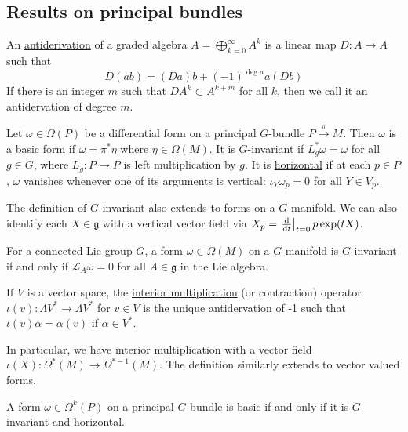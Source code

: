 \subsection{Results on principal bundles}
\begin{defn} %
	An \underline{antiderivation} of a graded algebra $A=\bigoplus_{k=0}^\infty
	A^k$ is a linear map $D : A\to A$ such that 
	 \[
	D(ab) = (Da)b + (-1)^{\deg a} a(Db)
	\] 
	If there is an integer $m$ such that  $D A^k \subset A^{k+m}$ for all $k$,
	then we call it an antidervation of degree  $m$.
\end{defn}
\begin{defn} 
	Let  $\omega\in \Omega(P)$ be a differential form on a principal $G$-bundle
	$P\xrightarrow{\pi} M$. 
	Then $\omega$ is a \underline{basic form} if  $\omega = \pi^*\eta$
	where  $\eta\in\Omega(M)$. 
	It is \underline{$G$-invariant} if $L^*_g \omega =\omega$ for all  $g\in G$,
	where $L_g : P\to P$ is left multiplication by  $g$.
	It is \underline{horizontal} if at each $p\in P$,
    $\omega$ vanishes whenever one of its arguments is vertical:
	$\iota_Y\omega_p = 0$ for all  $Y\in V_p$.
\end{defn}
\noindent
The definition of $G$-invariant also extends to forms on a  $G$-manifold. 
We can also identify each $X\in \mathfrak{g}$ with 
a vertical vector field via $X_p = \odv{}{t}_{t=0} p \exp (t X)$. 
\begin{thm} %
	\label{thm:lie_invariant}
	For a connected Lie group $G$, a form $\omega\in \Omega(M)$ on a 
	 $G$-manifold is  $G$-invariant if and only if  $\mathcal{L}_A\omega=0$ for
	 all $A\in\mathfrak{g}$ in the Lie algebra.
\end{thm}
\begin{defn} \label{def:contraction} %
	If $V$ is a vector space, the \underline{interior multiplication} (or 
	contraction) operator $\iota(v) :
	\Lambda V^* \to \Lambda V^*$ for $v\in V$ is the unique antidervation of -1 
	such that $\iota(v)\alpha = \alpha(v)$ if  $\alpha\in V^*$.
\end{defn}
\noindent
In particular, we have interior multiplication with a vector
field $\iota(X) : \Omega^*(M) \to \Omega^{*-1}(M)$.
The definition similarly extends to vector valued forms.

\begin{thm} %
	A form  $\omega\in\Omega^k(P)$ on a principal $G$-bundle is 
	basic if and only if it is $G$-invariant and horizontal.
\end{thm}

